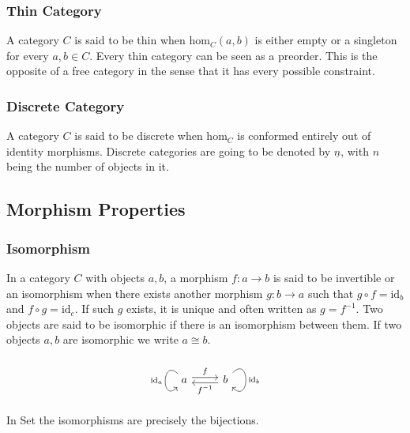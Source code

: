 \subsubsection*{Thin Category}
A category $C$ is said to be thin when $\mathrm{hom}_C(a, b)$ is either empty or
a singleton for every $a,b\in C$. \parencite{adamek_herrlich_strecker:joy_cats}
Every thin category can be seen as a preorder. This is the opposite of a free
category in the sense that it has every possible constraint.

\subsubsection*{Discrete Category}
A category $C$ is said to be discrete when $\mathrm{hom}_C$ is conformed
entirely out of identity morphisms. \parencite{awodey:category_theory} Discrete
categories are going to be denoted by $\underline{n}$, with $n$ being the number
of objects in it.

\subsection{Morphism Properties}

\subsubsection*{Isomorphism}
In a category $C$ with objects $a, b$, a morphism $f: a\to b$ is said to be
invertible or an isomorphism when there exists another morphism $g:b \to a$ such
that $g\circ f = \mathrm{id}_b$ and $f\circ g = \mathrm{id}_c$.
\parencite{maclane:working_mathematician}
If such $g$ exists, it is unique and often written as $g= f^{-1}$. Two objects
are said to be isomorphic if there is an isomorphism between them. If two
objects $a,b$ are isomorphic we write $a\cong b$.
\[
  \begin{tikzcd} a & b
    \arrow["f", shift left=1, from=1-1, to=1-2]
    \arrow["{f^{-1}}", shift left=1, from=1-2, to=1-1]
    \arrow["\mathrm{id}_a"', out=90+45, in=-90-45, looseness=4.5, from=1-1, to=1-1]
    \arrow["\mathrm{id}_b", out=45, in=-45, looseness=4.5, from=1-2, to=1-2]
  \end{tikzcd}
\]
In Set the isomorphisms are precisely the bijections.

